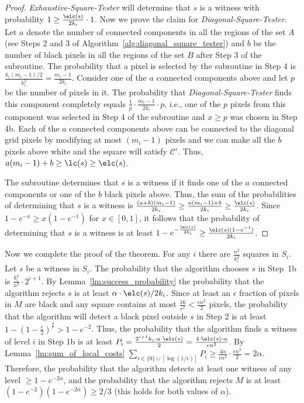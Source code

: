 \documentclass[11pt,english]{article}
\numberwithin{figure}{section}
\newcommand{\C}{{\mathcal C}}
\newcommand{\eps}{{\epsilon}}
\begin{document}
\begin{proof}
\emph{Exhaustive-Square-Tester} will determine that $s$ is a witness with
probability $1\geq \frac{\elc(s)}{2k_{i}}\cdot 1$. Now we prove the claim
for \emph{Diagonal-Square-Tester}. Let $a$ denote the number of connected components
in all the regions of the set $A$ (see Steps 2 and 3 of
Algorithm~\ref{alg:diagonal_square_tester}) and $b$ be the number
of black pixels in all the regions of the set $B$ after Step 3 of the subroutine.
The probability that a pixel is selected by the subroutine in Step 4 is
$\frac{k_{i}(m_{i}-1)/2}{k_{i}^{2}}=\frac{m_{i}-1}{2k_{i}}$.
Consider one of the $a$ connected components above and let $p$ be the number of
pixels in it.
The probability that \emph{Diagonal-Square-Tester} finds this component completely equals
$\frac{1}{p}\cdot\frac{m_{i}-1}{2k_{i}}\cdot p$, i.e., one of the $p$ pixels
from this component was selected in Step 4 of the subroutine and $x\geq p$ was
chosen in Step 4b. Each of the $a$ connected components above can be
connected to the diagonal grid pixels by modifying at most $(m_{i}-1)$ pixels
and we can make all the $b$ pixels above white and the square will satisfy
$\C'$. Thus, $a(m_{i}-1)+b\geq \lc(s)\geq \elc(s)$.

The subroutine determines that $s$ is a witness if it finds one of the $a$ connected components or one of the $b$ black pixels above.
Thus, the sum of the probabilities of determining that $s$ is a witness  is
 $\frac{(a+b)(m_{i}-1)}{2k_{i}}\geq\frac{a(m_{i}-1)+b}{2k_{i}}\geq\frac{\elc(s)}{2k_{i}}$.
 Since $1-e^{-x}\geq x(1-e^{-1})$ for $x\in[0,1]$, it follows that the
 probability of determining that $s$ is a witness is at least $1-e^{-\frac{\elc(s)}{2k_{i}}}\geq\frac{\elc(s)(1-e^{-1})}{2k_{i}}$.
\end{proof}


Now we complete the proof of the theorem. For any $i$ there are
$\frac{n^{2}}{k_{i}^{2}}$ squares in $S_{i}$. Let $s$ be a witness in $S_{i}$.
The probability that the algorithm chooses $s$ in Step~1b is
$\frac{k_{i}^{2}}{n^{2}}\cdot 2^{i+1}$.
By Lemma~\ref{lm:success_probability} the probability that the algorithm rejects
$s$ is at least $\alpha\cdot \elc(s)/2k_{i}$. Since at least an $\eps$
fraction of pixels in $M$ are black and any square contains at most
$\frac{16}{\eps^{2}}<\frac{\eps n^{2}}{2}$ pixels, the probability that the
algorithm will detect a black pixel outside $s$ in Step 2 is at least
$1-(1-\frac{\eps}{2})^{\frac{4}{\eps}}>1-e^{-2}$.
Thus, the probability that the algorithm finds a witness of level $i$ in Step 1b
is at least $P_{i}=\frac{2^{i+1}k_{i}\cdot\alpha\cdot
\elc(s)}{2}=\frac{4\cdot \elc(s)\cdot\alpha}{\eps n^{2}}$.
By Lemma~\ref{lm:sum_of_local_costs} $\sum\nolimits_{i\in
\{0\}\cup[\log(1/\eps)]}P_{i}\geq \frac{4\alpha}{\eps n^{2}}\cdot \frac{\eps
n^{2}}{2}=2\alpha$. Therefore, the probability that the algorithm detects at
least one witness of any level $\geq 1-e^{-2\alpha}$, and the probability
that the algorithm rejects $M$ is at least $(1-e^{-2})(1-e^{-2\alpha})\geq 2/3$
(this holds for both values of $\alpha$).
\end{document}
